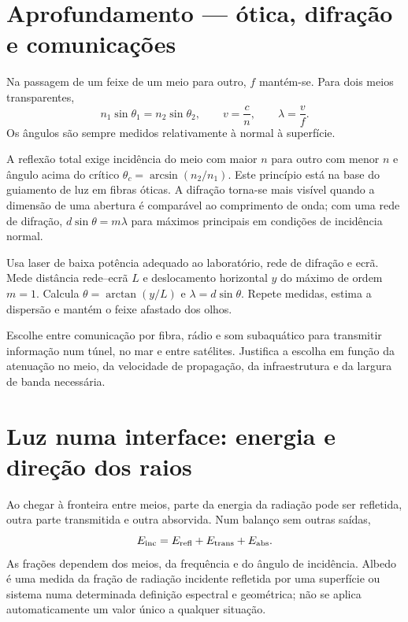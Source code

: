 \documentclass[11pt,a4paper,oneside]{book}
\begin{document}
\section{Aprofundamento — ótica, difração e comunicações}
Na passagem de um feixe de um meio para outro, $f$ mantém-se.
Para dois meios transparentes,
\[
n_1\sin\theta_1=n_2\sin\theta_2,\qquad
v=\frac{c}{n},\qquad \lambda=\frac{v}{f}.
\]
Os ângulos são sempre medidos relativamente à normal à superfície.
\begin{center}
\end{center}
A reflexão total exige incidência do meio com maior $n$ para
outro com menor $n$ e ângulo acima do crítico
$\theta_c=\arcsin(n_2/n_1)$. Este princípio está na base
do guiamento de luz em fibras óticas. A difração torna-se
mais visível quando a dimensão de uma abertura é comparável
ao comprimento de onda; com uma rede de difração,
$d\sin\theta=m\lambda$ para máximos principais em condições
de incidência normal.
\begin{atividade}[title=Determinar o comprimento de onda com uma rede]
Usa laser de baixa potência adequado ao laboratório, rede de
difração e ecrã. Mede distância rede--ecrã $L$ e deslocamento
horizontal $y$ do máximo de ordem $m=1$. Calcula
$\theta=\arctan(y/L)$ e $\lambda=d\sin\theta$.
Repete medidas, estima a dispersão e mantém o feixe afastado dos olhos.
\end{atividade}
\begin{mundo}
Escolhe entre comunicação por fibra, rádio e som subaquático
para transmitir informação num túnel, no mar e entre satélites.
Justifica a escolha em função da atenuação no meio, da velocidade
de propagação, da infraestrutura e da largura de banda necessária.
\end{mundo}

\section{Luz numa interface: energia e direção dos raios}
Ao chegar à fronteira entre meios, parte da energia
da radiação pode ser refletida, outra parte transmitida
e outra absorvida. Num balanço sem outras saídas,
\[
E_{\rm inc}=E_{\rm refl}+E_{\rm trans}+E_{\rm abs}.
\]
As frações dependem dos meios, da frequência e do
ângulo de incidência. Albedo é uma medida da fração
de radiação incidente refletida por uma superfície
ou sistema numa determinada definição espectral
e geométrica; não se aplica automaticamente
um valor único a qualquer situação.
\end{document}
